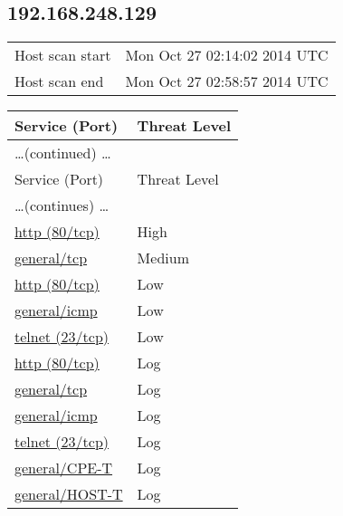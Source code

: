 \documentclass{article}
\begin{document}
\subsection{192.168.248.129}
\label{host:192.168.248.129}

\begin{tabular}{ll}
Host scan start&Mon Oct 27 02:14:02 2014 UTC\\
Host scan end&Mon Oct 27 02:58:57 2014 UTC\\
\end{tabular}

\begin{longtable}{|l|l|}
\hline
\rowcolor{openvas_report}Service (Port)&Threat Level\\
\hline
\endfirsthead
\multicolumn{2}{l}{\hfill\ldots (continued) \ldots}\\
\hline
\rowcolor{openvas_report}Service (Port)&Threat Level\\
\hline
\endhead
\hline
\multicolumn{2}{l}{\ldots (continues) \ldots}\\
\endfoot
\hline
\endlastfoot
\hline
\hyperref[port:192.168.248.129 http (80/tcp) High]{http (80/tcp)}&High\\
\hline
\hyperref[port:192.168.248.129 general/tcp Medium]{general/tcp}&Medium\\
\hline
\hyperref[port:192.168.248.129 http (80/tcp) Low]{http (80/tcp)}&Low\\
\hline
\hyperref[port:192.168.248.129 general/icmp Low]{general/icmp}&Low\\
\hline
\hyperref[port:192.168.248.129 telnet (23/tcp) Low]{telnet (23/tcp)}&Low\\
\hline
\hyperref[port:192.168.248.129 http (80/tcp) Log]{http (80/tcp)}&Log\\
\hline
\hyperref[port:192.168.248.129 general/tcp Log]{general/tcp}&Log\\
\hline
\hyperref[port:192.168.248.129 general/icmp Log]{general/icmp}&Log\\
\hline
\hyperref[port:192.168.248.129 telnet (23/tcp) Log]{telnet (23/tcp)}&Log\\
\hline
\hyperref[port:192.168.248.129 general/CPE-T Log]{general/CPE-T}&Log\\
\hline
\hyperref[port:192.168.248.129 general/HOST-T Log]{general/HOST-T}&Log\\
\hline
\end{longtable}


\end{document}
